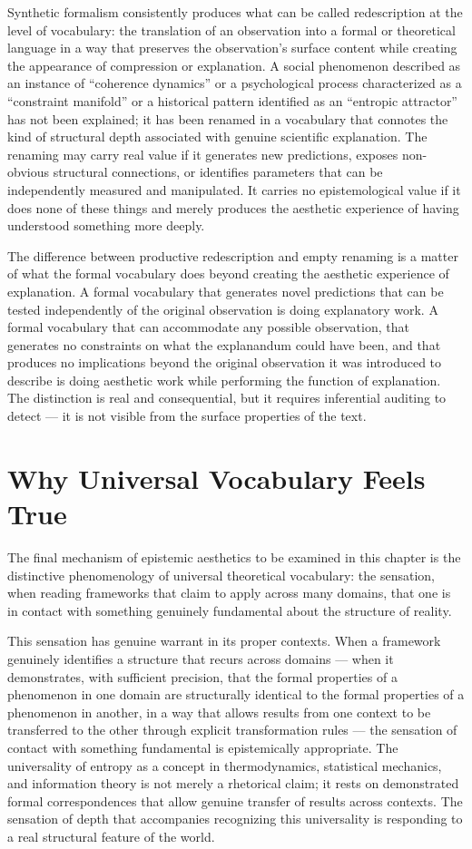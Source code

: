 \documentclass[12pt, openright, twoside]{book}
\begin{document}
Synthetic formalism consistently produces what can be called
redescription at the level of vocabulary: the translation of an
observation into a formal or theoretical language in a way that
preserves the observation's surface content while creating the
appearance of compression or explanation. A social phenomenon
described as an instance of ``coherence dynamics'' or a psychological
process characterized as a ``constraint manifold'' or a historical
pattern identified as an ``entropic attractor'' has not been explained;
it has been renamed in a vocabulary that connotes the kind of structural
depth associated with genuine scientific explanation. The renaming
may carry real value if it generates new predictions, exposes non-obvious
structural connections, or identifies parameters that can be independently
measured and manipulated. It carries no epistemological value if it
does none of these things and merely produces the aesthetic experience
of having understood something more deeply.

The difference between productive redescription and empty renaming is
a matter of what the formal vocabulary does beyond creating the
aesthetic experience of explanation. A formal vocabulary that generates
novel predictions that can be tested independently of the original
observation is doing explanatory work. A formal vocabulary that can
accommodate any possible observation, that generates no constraints
on what the explanandum could have been, and that produces no
implications beyond the original observation it was introduced to
describe is doing aesthetic work while performing the function of
explanation. The distinction is real and consequential, but it requires
inferential auditing to detect --- it is not visible from the surface
properties of the text.

\section{Why Universal Vocabulary Feels True}

The final mechanism of epistemic aesthetics to be examined in this
chapter is the distinctive phenomenology of universal theoretical
vocabulary: the sensation, when reading frameworks that claim to
apply across many domains, that one is in contact with something
genuinely fundamental about the structure of reality.

This sensation has genuine warrant in its proper contexts. When a
framework genuinely identifies a structure that recurs across domains ---
when it demonstrates, with sufficient precision, that the formal
properties of a phenomenon in one domain are structurally identical
to the formal properties of a phenomenon in another, in a way that
allows results from one context to be transferred to the other through
explicit transformation rules --- the sensation of contact with
something fundamental is epistemically appropriate. The universality
of entropy as a concept in thermodynamics, statistical mechanics,
and information theory is not merely a rhetorical claim; it rests
on demonstrated formal correspondences that allow genuine transfer
of results across contexts. The sensation of depth that accompanies
recognizing this universality is responding to a real structural
feature of the world.
\end{document}
